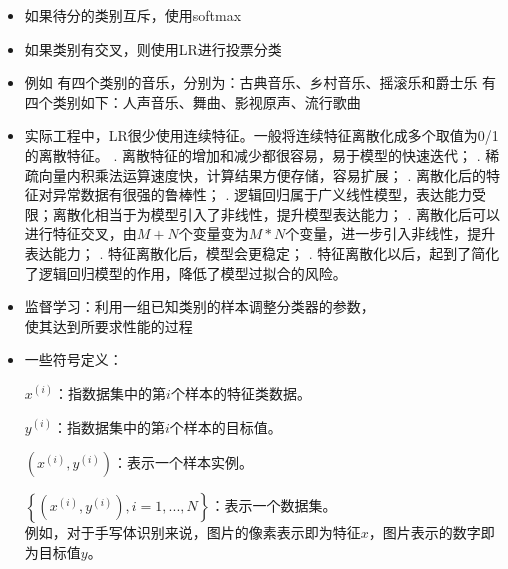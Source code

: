 \documentclass[10pt,a4paper]{ctexbook}
\begin{document}
\begin{itemize}
\item 如果待分的类别互斥，使用softmax
\item 如果类别有交叉，则使用LR进行投票分类
\item 例如
    \subitem 有四个类别的音乐，分别为：古典音乐、乡村音乐、摇滚乐和爵士乐
    \subitem 有四个类别如下：人声音乐、舞曲、影视原声、流行歌曲


\item 实际工程中，LR很少使用连续特征。一般将连续特征离散化成多个取值为0/1的离散特征。
. 离散特征的增加和减少都很容易，易于模型的快速迭代；
. 稀疏向量内积乘法运算速度快，计算结果方便存储，容易扩展；
. 离散化后的特征对异常数据有很强的鲁棒性；
. 逻辑回归属于广义线性模型，表达能力受限；离散化相当于为模型引入了非线性，提升模型表达能力；
. 离散化后可以进行特征交叉，由$M+N$个变量变为$M*N$个变量，进一步引入非线性，提升表达能力；
. 特征离散化后，模型会更稳定；
. 特征离散化以后，起到了简化了逻辑回归模型的作用，降低了模型过拟合的风险。

\end{itemize}




\begin{itemize}
\item 监督学习：利用一组已知类别的样本调整分类器的参数，\\使其达到所要求性能的过程
\item 一些符号定义：

$x^{(i)}$：指数据集中的第$i$个样本的特征类数据。

$y^{(i)}$：指数据集中的第$i$个样本的目标值。

$\left(x^{(i)},y^{(i)}\right)$：表示一个样本实例。

$\left\{\left(x^{(i)},y^{(i)}\right), i=1,...,N\right\}$：表示一个数据集。
\\例如，对于手写体识别来说，图片的像素表示即为特征$x$，图片表示的数字即为目标值$y$。

\end{itemize}
\end{document}
